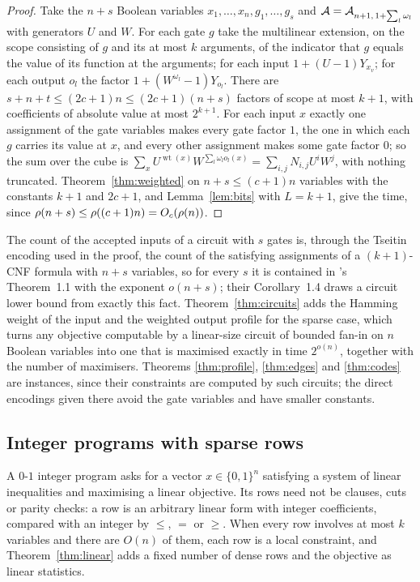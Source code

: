 \begin{proof}
Take the $n+s$ Boolean variables $x_1,\dots,x_n,g_1,\dots,g_s$ and
$\mathcal{A}=\mathcal{A}_{n+1,\,1+\sum_l\omega_l}$ with generators $U$ and $W$. For each gate $g$
take the multilinear extension, on the scope consisting of $g$ and its at most
$k$ arguments, of the indicator that $g$ equals the value of its function at the
arguments; for each input $1+(U-1)Y_{x_v}$; for each output $o_l$ the factor
$1+(W^{\omega_l}-1)Y_{o_l}$. There are $s+n+t\le(2c+1)n\le(2c+1)(n+s)$ factors of
scope at most $k+1$, with coefficients of absolute value at most $2^{k+1}$. For
each input $x$ exactly one assignment of the gate variables makes every gate
factor $1$, the one in which each $g$ carries its value at $x$, and every other
assignment makes some gate factor $0$; so the sum over the cube is
$\sum_xU^{\operatorname{wt}(x)}W^{\sum_l\omega_lo_l(x)}=\sum_{i,j}N_{i,j}U^{i}W^{j}$,
with nothing truncated. Theorem~\ref{thm:weighted} on $n+s\le(c+1)n$ variables
with the constants $k+1$ and $2c+1$, and Lemma~\ref{lem:bits} with $L=k+1$,
give the time, since $\rho(n+s)\le\rho((c+1)n)=O_c(\rho(n))$.
\end{proof}

\begin{remark}
The count of the accepted inputs of a circuit with $s$ gates is, through the
Tseitin encoding used in the proof, the count of the satisfying assignments of a
$(k+1)$-CNF formula with $n+s$ variables, so for every $s$ it is contained in
\oai{}'s Theorem~1.1 with the exponent $o(n+s)$; their Corollary~1.4 draws a
circuit lower bound from exactly this fact. Theorem~\ref{thm:circuits} adds the
Hamming weight of the input and the weighted output profile for the sparse
case, which turns any objective computable by a linear-size circuit of bounded
fan-in on $n$ Boolean variables into one that is maximised exactly in time
$2^{o(n)}$, together with the number of maximisers. Theorems \ref{thm:profile},
\ref{thm:edges} and \ref{thm:codes} are instances, since their constraints are
computed by such circuits; the direct encodings given there avoid the gate
variables and have smaller constants.
\end{remark}

\subsection{Integer programs with sparse rows}\label{ssec:ip}
A $0$-$1$ integer program asks for a vector $x\in\{0,1\}^n$ satisfying a system
of linear inequalities and maximising a linear objective. Its rows need not
be clauses, cuts or parity checks: a row is an arbitrary linear form with
integer coefficients, compared with an integer by $\le$, $=$ or $\ge$. When
every row involves at most $k$ variables and there are $O(n)$ of them, each row
is a local constraint, and Theorem~\ref{thm:linear} adds a fixed number of
dense rows and the objective as linear statistics.

